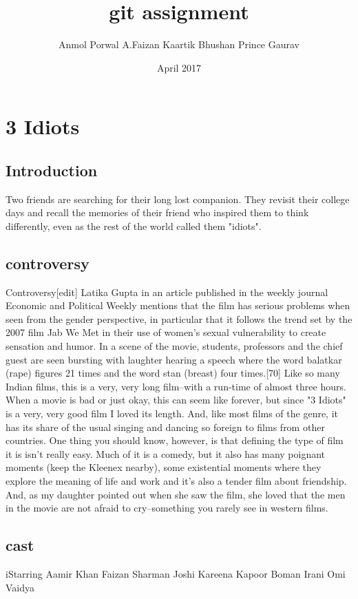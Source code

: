 \documentclass{article}
\title{git assignment}
\author{Anmol Porwal A.Faizan Kaartik Bhushan Prince Gaurav }
\date{April 2017}
\begin{document}
\maketitle

\section{3 Idiots}

\subsection{Introduction}
Two friends are searching for their long lost companion. They revisit their college days and recall the memories of their friend who inspired them to think differently, even as the rest of the world called them "idiots".
\subsection{controversy}
Controversy[edit]
Latika Gupta in an article published in the weekly journal Economic and Political Weekly mentions that the film has serious problems when seen from the gender perspective, in particular that it follows the trend set by the 2007 film Jab We Met in their use of women's sexual vulnerability to create sensation and humor. In a scene of the movie, students, professors and the chief guest are seen bursting with laughter hearing a speech where the word balatkar (rape) figures 21 times and the word stan (breast) four times.[70]
Like so many Indian films, this is a very, very long film--with a run-time of almost three hours. When a movie is bad or just okay, this can seem like forever, but since "3 Idiots" is a very, very good film I loved its length. And, like most films of the genre, it has its share of the usual singing and dancing so foreign to films from other countries. One thing you should know, however, is that defining the type of film it is isn't really easy. Much of it is a comedy, but it also has many poignant moments (keep the Kleenex nearby), some existential moments where they explore the meaning of life and work and it's also a tender film about friendship. And, as my daughter pointed out when she saw the film, she loved that the men in the movie are not afraid to cry--something you rarely see in western films.

\subsection{cast}
iStarring	
Aamir Khan
Faizan
Sharman Joshi
Kareena Kapoor
Boman Irani
Omi Vaidya
\end{document}
